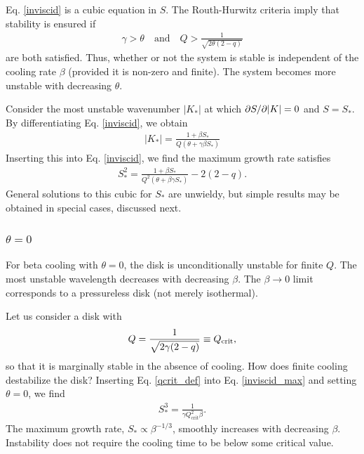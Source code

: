 Eq. \ref{inviscid} is a cubic equation in $S$. The 
Routh-Hurwitz criteria imply that stability is ensured if 
\begin{align}\label{stable_condition}
  \gamma > \theta \quad \text{and} \quad 
  Q > \frac{1}{\sqrt{2\theta(2-q)}} 
\end{align}
are both satisfied. Thus, whether or not the system is stable is
independent of the cooling rate $\beta$ (provided it is non-zero and
finite). The system becomes more unstable with decreasing $\theta$.   

Consider the most unstable wavenumber $|K_*|$ at which $\partial S/\partial |K| =
0$ and $S = 
S_*$. By differentiating Eq. \ref{inviscid}, we obtain 
\begin{align}\label{kstar}
  |K_*| = \frac{1+\beta S_*}{Q\left(\theta + \gamma \beta S_*\right)}
\end{align}
Inserting this into Eq. \ref{inviscid}, we find the maximum growth
rate satisfies
\begin{align}\label{inviscid_max}
  S_*^2 = \frac{1+\beta S_*}{Q^2\left(\theta + \beta\gamma S_*\right)}
  - 2(2-q).
\end{align}
General solutions to this cubic for $S_*$ are unwieldy, but simple
results may be obtained in special cases, discussed next. 


\subsubsection{$\theta = 0$}\label{theta0}
For beta cooling with $\theta=0$, the disk is unconditionally
unstable for finite $Q$. The most unstable wavelength decreases with
decreasing $\beta$. The $\beta\to0$ limit corresponds to a
pressureless disk (not merely isothermal).   


Let us consider a disk with 
\begin{align}\label{qcrit_def}
  Q = \frac{1}{\sqrt{2\gamma(2-q)}}\equiv Q_{\mathrm{crit}},
\end{align} 
so that it is marginally stable in the absence of cooling.  
How does finite cooling destabilize the disk?  
Inserting Eq. \ref{qcrit_def} into Eq. \ref{inviscid_max} and setting
$\theta=0$, we find 
\begin{align}\label{sstar}
  S_*^3 = \frac{1}{\gamma Q_\mathrm{crit}^2 \beta}. 
\end{align}
The maximum growth rate, $S_*\propto \beta^{-1/3}$, smoothly
increases with decreasing $\beta$. Instability does not require the
cooling time to be below some critical value. 

